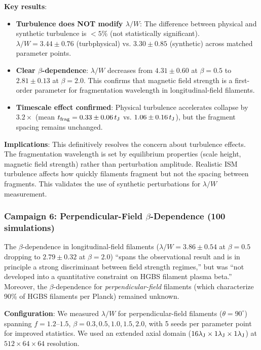 \documentclass[twocolumn,longtitle,usenatbib]{mnras}
\begin{document}
\textbf{Key results}:
\begin{itemize}
    \item \textbf{Turbulence does NOT modify $\lambda/W$}: The difference between physical and synthetic turbulence is $<5\%$ (not statistically significant). $\lambda/W = 3.44 \pm 0.76$ (turbphysical) vs. $3.30 \pm 0.85$ (synthetic) across matched parameter points.
    \item \textbf{Clear $\beta$-dependence}: $\lambda/W$ decreases from $4.31 \pm 0.60$ at $\beta = 0.5$ to $2.81 \pm 0.13$ at $\beta = 2.0$. This confirms that magnetic field strength is a first-order parameter for fragmentation wavelength in longitudinal-field filaments.
    \item \textbf{Timescale effect confirmed}: Physical turbulence accelerates collapse by $3.2\times$ (mean $t_{\rm frag} = 0.33 \pm 0.06\,t_{\rm J}$ vs. $1.06 \pm 0.16\,t_{\rm J}$), but the fragment spacing remains unchanged.
\end{itemize}

\textbf{Implications}: This definitively resolves the concern about turbulence effects. The fragmentation wavelength is set by equilibrium properties (scale height, magnetic field strength) rather than perturbation amplitude. Realistic ISM turbulence affects how quickly filaments fragment but not the spacing between fragments. This validates the use of synthetic perturbations for $\lambda/W$ measurement.

\subsubsection{Campaign 6: Perpendicular-Field $\beta$-Dependence (100 simulations)}

The $\beta$-dependence in longitudinal-field filaments ($\lambda/W = 3.86 \pm 0.54$ at $\beta = 0.5$ dropping to $2.79 \pm 0.32$ at $\beta = 2.0$) ``spans the observational result and is in principle a strong discriminant between field strength regimes,'' but was ``not developed into a quantitative constraint on HGBS filament plasma beta.'' Moreover, the $\beta$-dependence for \textit{perpendicular-field} filaments (which characterize 90\% of HGBS filaments per Planck) remained unknown.

\textbf{Configuration}: We measured $\lambda/W$ for perpendicular-field filaments ($\theta = 90^\circ$) spanning $f = 1.2$--$1.5$, $\beta = 0.3, 0.5, 1.0, 1.5, 2.0$, with 5 seeds per parameter point for improved statistics. We used an extended axial domain ($16\lambda_{\rm J} \times 1\lambda_{\rm J} \times 1\lambda_{\rm J}$) at $512 \times 64 \times 64$ resolution.
\end{document}

